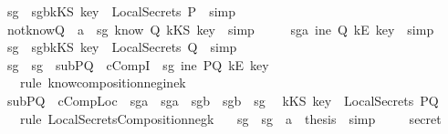 \begin{isabellebody}
\ \ \isamarkupfalse \ sg{}\ \isamarkupfalse \ sg{}b{\isacharcolon}{\isachardoublequoteopen}kKS\ key\ {\isasymnotin}\ LocalSecrets\ P{\isachardoublequoteclose}\ \isamarkupfalse \ simp\isanewline
\ \ \isamarkupfalse \ notknowQ\ \ a{}\ \isamarkupfalse \ sg{}{\isacharcolon}{\isachardoublequoteopen}{\isasymnot}\ know\ Q\ {\isacharparenleft}kKS\ key{\isacharparenright}{\isachardoublequoteclose}\ \isamarkupfalse \ simp\isanewline
\ \ \isamarkupfalse \ \ \isamarkupfalse \ sg{}a{\isacharcolon}{\isachardoublequoteopen}{\isasymnot}\ ine\ Q\ {\isacharparenleft}kE\ key{\isacharparenright}{\isachardoublequoteclose}\ \isamarkupfalse \ simp\isanewline
\ \ \isamarkupfalse \ sg{}\ \isamarkupfalse \ sg{}b{\isacharcolon}{\isachardoublequoteopen}kKS\ key\ {\isasymnotin}\ LocalSecrets\ Q{\isachardoublequoteclose}\ \isamarkupfalse \ simp\isanewline
\ \ \isamarkupfalse \ sg{}\ \ sg{}\ \ subPQ\ \ cCompI\ \isamarkupfalse \ sg{}{\isacharcolon}{\isachardoublequoteopen}{\isasymnot}\ ine\ PQ\ {\isacharparenleft}kE\ key{\isacharparenright}{\isachardoublequoteclose}\isanewline
\ \ \ \ \isamarkupfalse \ {\isacharparenleft}rule\ know{\isacharunderscore}composition{\isacharunderscore}neg{\isacharunderscore}ine{\isacharunderscore}k{\isacharparenright}\isanewline
\ \ \isamarkupfalse \ subPQ\ \ cCompLoc\ \ sg{}a\ \ sg{}a\ \ sg{}b\ \ sg{}b\ \isamarkupfalse \ sg{}{\isacharcolon}\isanewline
\ \ {\isachardoublequoteopen}kKS\ key\ {\isasymnotin}\ LocalSecrets\ PQ{\isachardoublequoteclose}\ \isanewline
\ \ \ \ \isamarkupfalse \ {\isacharparenleft}rule\ LocalSecretsComposition{\isacharunderscore}neg{}{\isacharunderscore}k{\isacharparenright}\isanewline
\ \ \isamarkupfalse \ sg{}\ \ sg{}\ \ a{}\ \isamarkupfalse \ {\isacharquery}thesis\ \isamarkupfalse \ simp\isanewline
{}\isamarkupfalse \ \isanewline
\ \ \isamarkupfalse \ secret\isanewline

\end{isabellebody}
